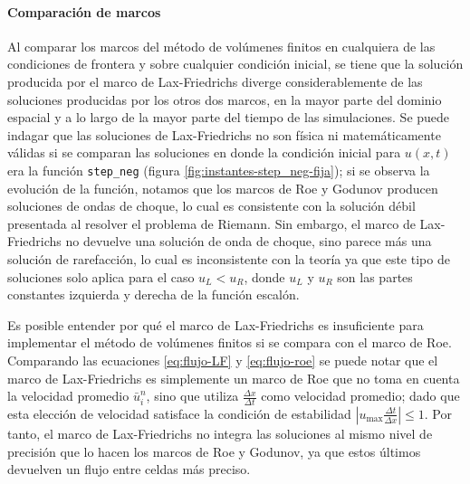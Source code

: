 \documentclass[12pt]{article}
\begin{document}
	\paragraph{Comparación de marcos}
	
	Al comparar los marcos del método de volúmenes finitos en cualquiera de las condiciones de frontera y sobre cualquier condición inicial, se tiene que la solución producida por el marco de Lax-Friedrichs diverge considerablemente de las soluciones producidas por los otros dos marcos, en la mayor parte del dominio espacial y a lo largo de la mayor parte del tiempo de las simulaciones. Se puede indagar que las soluciones de Lax-Friedrichs no son física ni matemáticamente válidas si se comparan las soluciones en donde la condición inicial para $u(x,t)$ era la función \texttt{step\_neg} (figura \ref{fig:instantes-step_neg-fija}); si se observa la evolución de la función, notamos que los marcos de Roe y Godunov producen soluciones de ondas de choque, lo cual es consistente con la solución débil presentada al resolver el problema de Riemann. Sin embargo, el marco de Lax-Friedrichs no devuelve una solución de onda de choque, sino parece más una solución de rarefacción, lo cual es inconsistente con la teoría ya que este tipo de soluciones solo aplica para el caso $u_L < u_R$, donde $u_L$ y  $u_R$ son las partes constantes izquierda y derecha de la función escalón.
	
	Es posible entender por qué el marco de Lax-Friedrichs es insuficiente para implementar el método de volúmenes finitos si se compara con el marco de Roe. Comparando las ecuaciones \ref{eq:flujo-LF} y \ref{eq:flujo-roe} se puede notar que el marco de Lax-Friedrichs es simplemente un marco de Roe que no toma en cuenta la velocidad promedio $\bar{u}_{i}^{n}$, sino que utiliza $\frac{\Delta x}{\Delta t}$ como velocidad promedio; dado que esta elección de velocidad satisface la condición de estabilidad $|u_{\text{max}}\frac{\Delta t}{\Delta x}| \leq 1$. Por tanto, el marco de Lax-Friedrichs no integra las soluciones al mismo nivel de precisión que lo hacen los marcos de Roe y Godunov, ya que estos últimos devuelven un flujo entre celdas más preciso.
	
\end{document}
